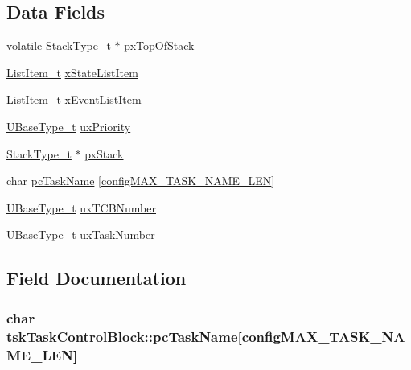 \subsection*{Data Fields}
\begin{DoxyCompactItemize}
\item 
volatile \hyperlink{portmacro_8h_a84e9a8ba132feed0b2401c1f4e2ac63c}{Stack\+Type\+\_\+t} $\ast$ \hyperlink{structtskTaskControlBlock_a429a186c7f8e34aba1eef5e12d215b90}{px\+Top\+Of\+Stack}
\item 
\hyperlink{list_8h_a1a62d469392f9bfe2443e7efab9c8398}{List\+Item\+\_\+t} \hyperlink{structtskTaskControlBlock_a16e0d20425d53ac78537e1fdb8834cf6}{x\+State\+List\+Item}
\item 
\hyperlink{list_8h_a1a62d469392f9bfe2443e7efab9c8398}{List\+Item\+\_\+t} \hyperlink{structtskTaskControlBlock_a1a1612b6081a13683808284d93a9b28f}{x\+Event\+List\+Item}
\item 
\hyperlink{portmacro_8h_a646f89d4298e4f5afd522202b11cb2e6}{U\+Base\+Type\+\_\+t} \hyperlink{structtskTaskControlBlock_a79187811e3d2a15595942e3b44237d85}{ux\+Priority}
\item 
\hyperlink{portmacro_8h_a84e9a8ba132feed0b2401c1f4e2ac63c}{Stack\+Type\+\_\+t} $\ast$ \hyperlink{structtskTaskControlBlock_a9a0d71a9f95dd0609f9911d9efd79134}{px\+Stack}
\item 
char \hyperlink{structtskTaskControlBlock_a67d61291794f38afb5be5132078bc24f}{pc\+Task\+Name} \mbox{[}\hyperlink{FreeRTOS_8h_ac388dc4041aab6997348828eb27fc1a8}{config\+M\+A\+X\+\_\+\+T\+A\+S\+K\+\_\+\+N\+A\+M\+E\+\_\+\+L\+EN}\mbox{]}
\item 
\hyperlink{portmacro_8h_a646f89d4298e4f5afd522202b11cb2e6}{U\+Base\+Type\+\_\+t} \hyperlink{structtskTaskControlBlock_a3f3169fa5667af8ee542304f8dd48553}{ux\+T\+C\+B\+Number}
\item 
\hyperlink{portmacro_8h_a646f89d4298e4f5afd522202b11cb2e6}{U\+Base\+Type\+\_\+t} \hyperlink{structtskTaskControlBlock_a46894d7d546d614cc881212dc8039f41}{ux\+Task\+Number}
\end{DoxyCompactItemize}


\subsection{Field Documentation}
\subsubsection[{\texorpdfstring{pc\+Task\+Name}{pcTaskName}}]{\setlength{\rightskip}{0pt plus 5cm}char tsk\+Task\+Control\+Block\+::pc\+Task\+Name\mbox{[}{\bf config\+M\+A\+X\+\_\+\+T\+A\+S\+K\+\_\+\+N\+A\+M\+E\+\_\+\+L\+EN}\mbox{]}}\hypertarget{structtskTaskControlBlock_a67d61291794f38afb5be5132078bc24f}{}\label{structtskTaskControlBlock_a67d61291794f38afb5be5132078bc24f}
